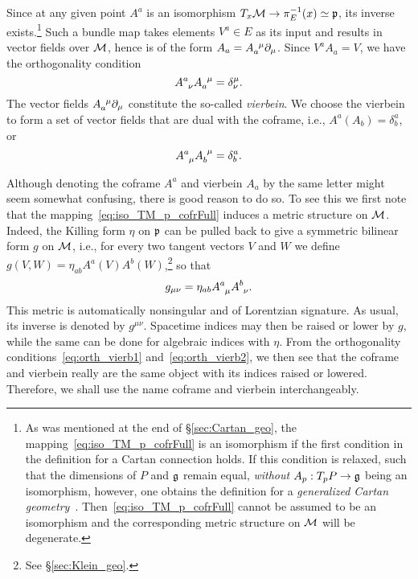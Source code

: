 \documentclass[
final,
11pt,
a4paper,
DIV=11,
headinclude=true,
footinclude=false,
bibliography=totoc,
twoside=true,  %
BCOR=5mm
]{scrbook}
\begin{document}
Since at any given point $A^a$ is an isomorphism $T_x\mathcal{M} \to 
\pi_E^{-1}(x) \simeq \mathfrak{p}$,
its inverse exists.\footnote{As was mentioned at the end of 
  \S\ref{sec:Cartan_geo}, the 
  mapping~\eqref{eq:iso_TM_p_cofrFull} is an isomorphism if the 
  first condition in the definition for a Cartan connection 
  holds. If this condition is relaxed, such that the dimensions 
  of $P$ and $\mathfrak{g}$ remain equal, \emph{without} $A_p : T_p 
  P \to \mathfrak{g}$ being an isomorphism, however, one obtains the 
  definition for a \emph{generalized Cartan 
    geometry}~\cite{Wise:2010sm}.  
  Then~\eqref{eq:iso_TM_p_cofrFull} cannot be assumed to be an 
  isomorphism and the corresponding metric structure on $\mathcal{M}$ 
  will be degenerate.}
Such a bundle map takes elements $V^a \in E$ as its input and 
results in vector fields over $\mathcal{M}$, hence is of the form $A_a 
= A\ind{_a^\mu}\pd_\mu$.  Since $V^a A_a= V$, we have the 
orthogonality condition
\begin{equation}
\label{eq:orth_vierb1}
  A\ind{^a_\nu} A\ind{_a^\mu} = \delta^\mu_\nu.
\end{equation}
The vector fields $A\ind{_a^\mu}\pd_\mu$ constitute the so-called 
\emph{vierbein}. We choose the vierbein to form a set of vector 
fields that are dual with the coframe, i.e., $A^a(A_b) = 
\delta^a_b$, or
\begin{equation}
\label{eq:orth_vierb2}
  A\ind{^a_\mu} A\ind{_b^\mu} = \delta^a_b.
\end{equation}

Although denoting the coframe $A^a$ and
vierbein $A_a$ by the same letter might seem somewhat confusing, 
there is good reason to do so. To see this we first note that the 
mapping~\eqref{eq:iso_TM_p_cofrFull} induces a metric structure 
on $\mathcal{M}$. Indeed, the Killing form $\eta$ on $\mathfrak{p}$ can be 
pulled back to give a symmetric bilinear form $g$ on $\mathcal{M}$, 
i.e., for every two tangent vectors $V$ and $W$ we define $g(V,W) 
= \eta_{ab} A^a(V) A^b(W)$,\footnote{See \S\ref{sec:Klein_geo}.} 
so that
\begin{equation*}
  g_{\mu\nu} = \eta_{ab} A\ind{^a_\mu} A\ind{^b_\nu}.
\end{equation*}
This metric is automatically nonsingular and of Lorentzian 
signature. As usual, its inverse is denoted by $g^{\mu\nu}$.  
Spacetime indices may then be raised or lower by $g$, while the 
same can be done for algebraic indices with $\eta$. From the 
orthogonality conditions~\eqref{eq:orth_vierb1} 
and~\eqref{eq:orth_vierb2}, we then see that the coframe and 
vierbein really are the same object with its indices raised or 
lowered. Therefore, we shall use the name coframe and vierbein 
interchangeably.
\end{document}
